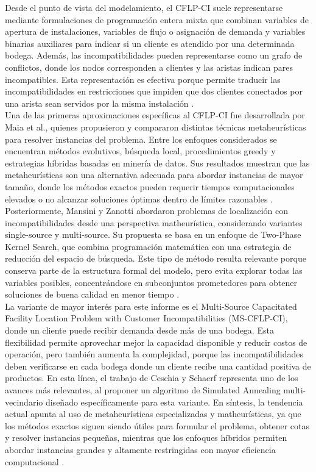 \noindent Desde el punto de vista del modelamiento, el CFLP-CI suele representarse mediante formulaciones de programación entera mixta que combinan variables de apertura de instalaciones, variables de flujo o asignación de demanda y variables binarias auxiliares para indicar si un cliente es atendido por una determinada bodega. Además, las incompatibilidades pueden representarse como un grafo de conflictos, donde los nodos corresponden a clientes y las aristas indican pares incompatibles. Esta representación es efectiva porque permite traducir las incompatibilidades en restricciones que impiden que dos clientes conectados por una arista sean servidos por la misma instalación \cite{maia2023metaheuristic,mansini2022kernel,ceschia2024multineighborhood}.\\

\noindent Una de las primeras aproximaciones específicas al CFLP-CI fue desarrollada por Maia et al., quienes propusieron y compararon distintas técnicas metaheurísticas para resolver instancias del problema. Entre los enfoques considerados se encuentran métodos evolutivos, búsqueda local, procedimientos greedy y estrategias híbridas basadas en minería de datos. Sus resultados muestran que las metaheurísticas son una alternativa adecuada para abordar instancias de mayor tamaño, donde los métodos exactos pueden requerir tiempos computacionales elevados o no alcanzar soluciones óptimas dentro de límites razonables \cite{maia2023metaheuristic}.\\

\noindent Posteriormente, Mansini y Zanotti abordaron problemas de localización con incompatibilidades desde una perspectiva matheurística, considerando variantes single-source y multi-source. Su propuesta se basa en un enfoque de Two-Phase Kernel Search, que combina programación matemática con una estrategia de reducción del espacio de búsqueda. Este tipo de método resulta relevante porque conserva parte de la estructura formal del modelo, pero evita explorar todas las variables posibles, concentrándose en subconjuntos prometedores para obtener soluciones de buena calidad en menor tiempo \cite{mansini2022kernel}.\\

\noindent La variante de mayor interés para este informe es el Multi-Source Capacitated Facility Location Problem with Customer Incompatibilities (MS-CFLP-CI), donde un cliente puede recibir demanda desde más de una bodega. Esta flexibilidad permite aprovechar mejor la capacidad disponible y reducir costos de operación, pero también aumenta la complejidad, porque las incompatibilidades deben verificarse en cada bodega donde un cliente recibe una cantidad positiva de productos. En esta línea, el trabajo de Ceschia y Schaerf representa uno de los avances más relevantes, al proponer un algoritmo de Simulated Annealing multi-vecindario diseñado específicamente para esta variante. En síntesis, la tendencia actual apunta al uso de metaheurísticas especializadas y matheurísticas, ya que los métodos exactos siguen siendo útiles para formular el problema, obtener cotas y resolver instancias pequeñas, mientras que los enfoques híbridos permiten abordar instancias grandes y altamente restringidas con mayor eficiencia computacional \cite{ceschia2024multineighborhood,mansini2022kernel,fischetti2016benders}.